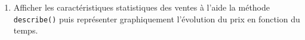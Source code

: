 \documentclass[a4paper]{article}
\begin{document}
\begin{enumerate}
\begin{center}
\end{center}
\item  Afficher les caractéristiques statistiques des ventes à l'aide la méthode {\tt describe()} puis représenter graphiquement l'évolution du prix en fonction du temps.
\end{enumerate}
\end{document}
